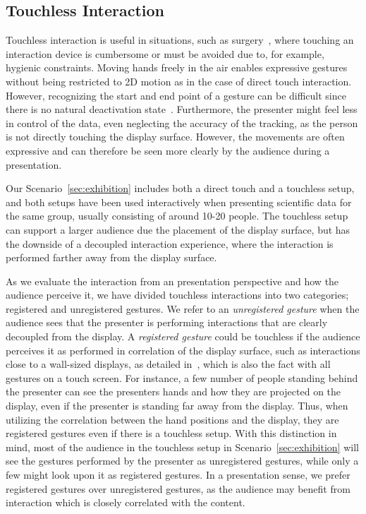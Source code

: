 \documentclass[review,journal]{vgtc}         %
\begin{document}
\subsection{Touchless Interaction}\label{subsec:touchless}
Touchless interaction is useful in situations, such as surgery~\cite{Mentis:2012:IPI:2207676.2208536}, where touching an interaction device is cumbersome or must be avoided due to, for example, hygienic constraints.
Moving hands freely in the air enables expressive gestures without being restricted to 2D motion as in the case of direct touch interaction.
However, recognizing the start and end point of a gesture can be difficult since there is no natural deactivation state~\cite{Kirmizibayrak:2011:EGB:2087756.2087764}.
Furthermore, the presenter might feel less in control of the data, even neglecting the accuracy of the tracking, as the person is not directly touching the display surface.
However, the movements are often expressive and can therefore be seen more clearly by the audience during a presentation.

Our Scenario~\ref{sec:exhibition} includes both a direct touch and a touchless setup, and both setups have been used interactively when presenting scientific data for the same group, usually consisting of around 10-20 people.
The touchless setup can support a larger audience due the placement of the display surface, but has the downside of a decoupled interaction experience, where the interaction is performed farther away from the display surface.

As we evaluate the interaction from an presentation perspective and how the audience perceive it, we have divided touchless interactions into two categories; registered and unregistered gestures.
We refer to an \emph{unregistered gesture} when the audience sees that the presenter is performing interactions that are clearly decoupled from the display. 
A \emph{registered gesture} could be touchless if the audience perceives it as performed in correlation of the display surface, such as interactions close to a wall-sized displays, as detailed in~\cite{Bezerianos:2007:DSU:1467769}, which is also the fact with all gestures on a touch screen. 
For instance, a few number of people standing behind the presenter can see the presenters hands and how they are projected on the display, even if the presenter is standing far away from the display.
Thus, when utilizing the correlation between the hand positions and the display, they are registered gestures even if there is a touchless setup.
With this distinction in mind, most of the audience in the touchless setup in Scenario~\ref{sec:exhibition} will see the gestures performed by the presenter as unregistered gestures, while only a few might look upon it as registered gestures.
In a presentation sense, we prefer registered gestures over unregistered gestures, as the audience may benefit from interaction which is closely correlated with the content.
 
\end{document}
